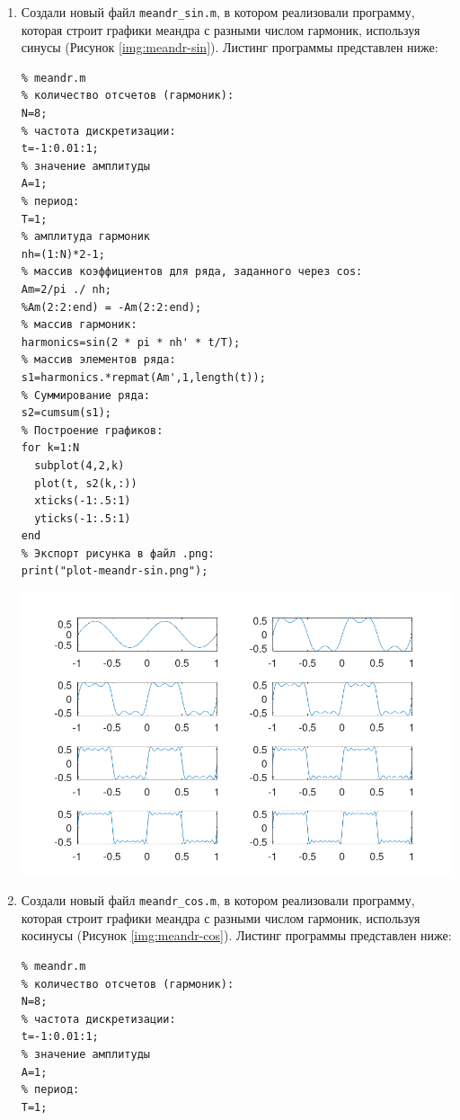 \begin{enumerate}
    \item Создали новый файл \texttt{meandr\_sin.m}, в котором реализовали программу,
        которая строит графики меандра с разными числом гармоник, используя синусы
        (Рисунок \ref{img:meandr-sin}). Листинг программы представлен ниже:
        \begin{verbatim}
% meandr.m
% количество отсчетов (гармоник):
N=8;
% частота дискретизации:
t=-1:0.01:1;
% значение амплитуды
A=1;
% период:
T=1;
% амплитуда гармоник
nh=(1:N)*2-1;
% массив коэффициентов для ряда, заданного через cos:
Am=2/pi ./ nh;
%Am(2:2:end) = -Am(2:2:end);
% массив гармоник:
harmonics=sin(2 * pi * nh' * t/T);
% массив элементов ряда:
s1=harmonics.*repmat(Am',1,length(t));
% Суммирование ряда:
s2=cumsum(s1);
% Построение графиков:
for k=1:N
  subplot(4,2,k)
  plot(t, s2(k,:))
  xticks(-1:.5:1)
  yticks(-1:.5:1)
end
% Экспорт рисунка в файл .png:
print("plot-meandr-sin.png");
        \end{verbatim}

        \begin{center}
            \centering
            \includegraphics[width=\textwidth]{../octave/plot-meandr-sin.png}
            \label{img:meandr-sin}
        \end{center}

    \item Создали новый файл \texttt{meandr\_cos.m}, в котором реализовали программу,
        которая строит графики меандра с разными числом гармоник, используя косинусы
        (Рисунок \ref{img:meandr-cos}). Листинг программы представлен ниже:
        \begin{verbatim}
% meandr.m
% количество отсчетов (гармоник):
N=8;
% частота дискретизации:
t=-1:0.01:1;
% значение амплитуды
A=1;
% период:
T=1;


\end{verbatim}
\end{enumerate}
